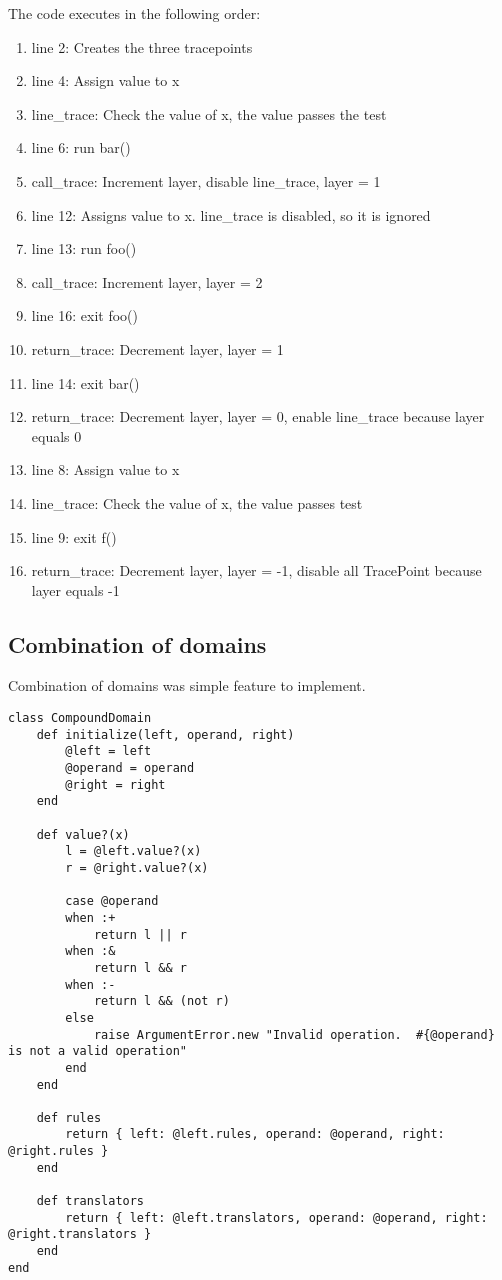 The code executes in the following order:

\begin{enumerate}[noitemsep]
\item line 2: Creates the three tracepoints
\item line 4: Assign value to x
\item line\_trace: Check the value of x, the value passes the test
\item line 6: run bar()
\item call\_trace: Increment layer, disable line\_trace, layer = 1
\item line 12: Assigns value to x.  line\_trace is disabled, so it is ignored
\item line 13: run foo()
\item call\_trace: Increment layer, layer = 2
\item line 16: exit foo()
\item return\_trace: Decrement layer, layer = 1
\item line 14: exit bar()
\item return\_trace: Decrement layer, layer = 0, enable line\_trace because layer equals 0
\item line 8: Assign value to x
\item line\_trace: Check the value of x, the value passes test
\item line 9: exit f()
\item return\_trace: Decrement layer, layer = -1, disable all TracePoint because layer equals -1
\end{enumerate}

\subsection{Combination of domains}

Combination of domains was simple feature to implement.

\begin{lstlisting}[caption={Compound Domain class}]
class CompoundDomain
    def initialize(left, operand, right)
        @left = left
        @operand = operand
        @right = right
    end
    
    def value?(x)
        l = @left.value?(x)
        r = @right.value?(x)

        case @operand
        when :+
            return l || r
        when :&
            return l && r
        when :-
            return l && (not r)
        else
            raise ArgumentError.new "Invalid operation.  #{@operand} is not a valid operation"
        end
    end
    
    def rules
        return { left: @left.rules, operand: @operand, right: @right.rules }
    end
    
    def translators
        return { left: @left.translators, operand: @operand, right: @right.translators }
    end
end
\end{lstlisting}

